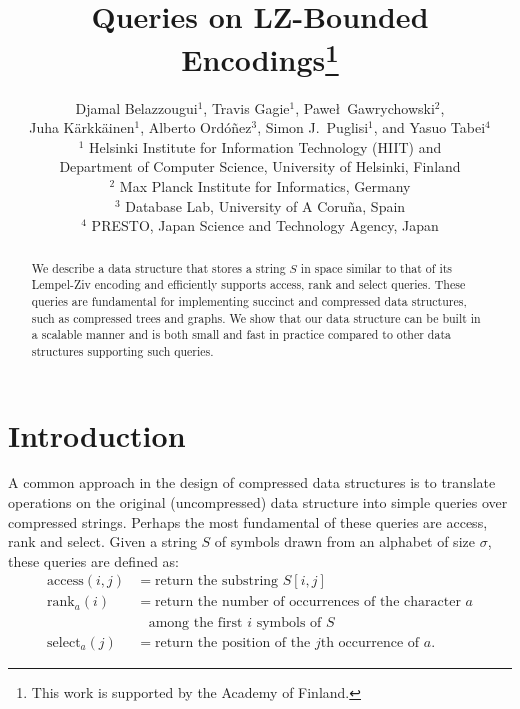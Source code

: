 \documentclass[12pt]{article}
\newcommand{\access}
  {\ensuremath{\mathrm{access}}}
\newcommand{\rank}
  {\ensuremath{\mathrm{rank}}}
\newcommand{\select}
  {\ensuremath{\mathrm{select}}}
\begin{document}
\title{\vspace{-4ex}Queries on LZ-Bounded Encodings\thanks{This work is supported by the Academy of Finland.}}


\author{\normalsize Djamal Belazzougui$^1$, Travis Gagie$^1$, Pawe\l\ Gawrychowski$^2$,\\ 
\normalsize Juha K\"arkk\"ainen$^1$, Alberto Ord\'o\~{n}ez$^3$, Simon J.\ Puglisi$^1$, and Yasuo Tabei$^4$\\[1ex]
\footnotesize $^1$ Helsinki Institute for Information Technology (HIIT) and\\[-0.8ex]
\footnotesize Department of Computer Science, University of Helsinki, Finland\\[-0.8ex]
\footnotesize $^2$ Max Planck Institute for Informatics, Germany\\[-0.8ex]
\footnotesize $^3$ Database Lab, University of A Coru\~{n}a, Spain\\[-0.8ex]
\footnotesize $^4$ PRESTO, Japan Science and Technology Agency, Japan}
\date{}
\maketitle
\vspace{-4ex}

\begin{abstract}
We describe a data structure that stores a string $S$ in space similar to that of its Lempel-Ziv encoding and efficiently supports access, rank and select queries. These queries are fundamental for implementing succinct and compressed data structures, such as compressed trees and graphs. We show that our data structure can be built in a scalable manner and is both small and fast in practice compared to other data structures supporting such queries.
\end{abstract}

\section{Introduction}
\label{sec:introduction}

A common approach in the design of compressed data structures is to translate operations on
the original (uncompressed) data structure into simple queries over compressed strings.
Perhaps the most fundamental of these queries are access, rank and select. Given a string $S$
of symbols drawn from an alphabet of size $\sigma$, these queries are defined as:
\begin{align*}
  \access(i,j) &= \text{return the substring $S[i,j]$} \\
  \rank_a(i) &= \text{return the number of occurrences of the character $a$}\\
  &\ \ \ \ \text{among the first $i$ symbols of $S$} \\
  \select_a(j) &= \text{return the position of the $j$th occurrence of $a$.} 
\end{align*}
\end{document}
